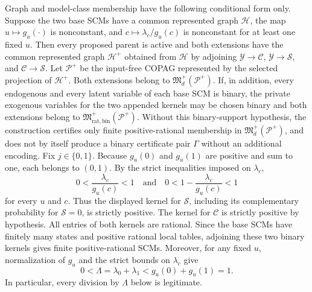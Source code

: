 Graph and model-class membership have the following conditional form only. Suppose the two base SCMs have a common represented graph \(\mathcal H\), the map \(u\mapsto g_u(\cdot)\) is nonconstant, and \(c\mapsto\lambda_c/g_u(c)\) is nonconstant for at least one fixed \(u\). Then every proposed parent is active and both extensions have the common represented graph \(\mathcal H^+\) obtained from \(\mathcal H\) by adjoining \(\mathcal Y\to\mathcal C\), \(\mathcal Y\to\mathcal S\), and \(\mathcal C\to\mathcal S\). Let \(\mathcal P^+\) be the input-free COPAG represented by the selected projection of \(\mathcal H^+\). Both extensions belong to \(\mathfrak M_d^+(\mathcal P^+)\). If, in addition, every endogenous and every latent variable of each base SCM is binary, the private exogenous variables for the two appended kernels may be chosen binary and both extensions belong to \(\mathfrak M_{\mathrm{rat,bin}}^+(\mathcal P^+)\). Without this binary-support hypothesis, the construction certifies only finite positive-rational membership in \(\mathfrak M_d^+(\mathcal P^+)\), and does not by itself produce a binary certificate pair \(\Gamma\) without an additional encoding.
Fix \(j\in\{0,1\}\). Because \(g_u(0)\) and \(g_u(1)\) are positive and sum to one, each belongs to \((0,1)\). By the strict inequalities imposed on \(\lambda_c\),
\[
 0<\frac{\lambda_c}{g_u(c)}<1
 \quad\text{and}\quad
 0<1-\frac{\lambda_c}{g_u(c)}<1                         \tag{1}
\]
for every \(u\) and \(c\). Thus the displayed kernel for \(\mathcal S\), including its complementary probability for \(\mathcal S=0\), is strictly positive. The kernel for \(\mathcal C\) is strictly positive by hypothesis. All entries of both kernels are rational. Since the base SCMs have finitely many states and positive rational local tables, adjoining these two binary kernels gives finite positive-rational SCMs. Moreover, for any fixed \(u\), normalization of \(g_u\) and the strict bounds on \(\lambda_c\) give
\[
 0<\Lambda=\lambda_0+\lambda_1
 <g_u(0)+g_u(1)=1.                                      \tag{2}
\]
In particular, every division by \(\Lambda\) below is legitimate.

